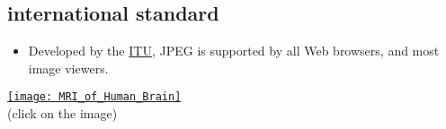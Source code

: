 \chapter{}

\section{ international standard}
\begin{itemize}
\item Developed by the
  \href{https://www.itu.int}{ITU}, \gls{JPEG}
  \cite{ccitt.t81} is
  supported by all Web browsers, and most image viewers.
\end{itemize}
\vspace{-2ex}
\begin{center}
  \href{https://en.wikipedia.org/wiki/Magnetic_resonance_imaging_of_the_brain#/media/File:MRI_of_Human_Brain.jpg}{\texttt{[image: MRI\_of\_Human\_Brain]}}\\
  (click on the image)
\end{center}